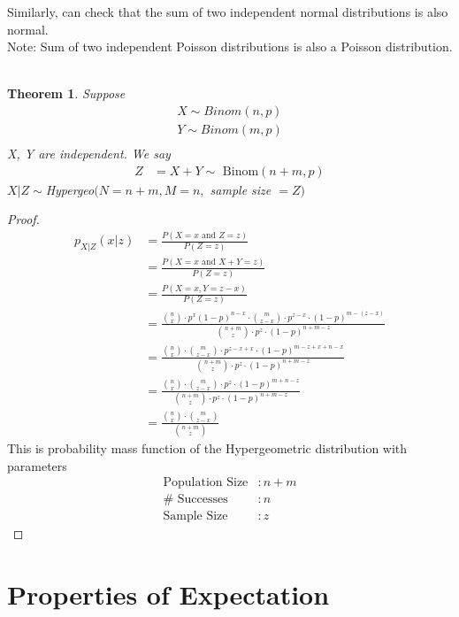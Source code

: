 \documentclass[11pt,oneside]{book}
\theoremstyle{break}
\theoremstyle{break}
\newtheorem{thm}{Theorem}[section]
\newcommand{\note}{\color{Purple}Note: \color{black}}
\begin{document}
Similarly, can check that the sum of two independent normal distributions is also normal. \\
\note Sum of two independent Poisson distributions is also a Poisson distribution.\\
\hfill\\
\begin{thm}
Suppose \begin{align*}
X\sim  Binom(n,p)\\
Y\sim  Binom(m,p)\\
\end{align*}
X, Y are independent. We say \begin{align*}
Z&=X+Y\sim \text{ Binom}(n+m,p)
\end{align*}
$X|Z\sim $Hypergeo$(N=n+m,M=n,$ sample size $=Z)$
\end{thm}
\begin{proof}
\begin{align*}
p_{X|Z}(x|z)&=\frac{P(X=x \text{ and }Z=z)}{P(Z=z)}\\
&=\frac{P(X=x \text{ and }X+Y=z)}{P(Z=z)}\\
&=\frac{P(X=x,Y=z-x)}{P(Z=z)}\\
&=\frac{\binom{n}{x}\cdot p^{x}(1-p)^{n-x}\cdot \binom{m}{z-x}\cdot p^{z-x}\cdot (1-p)^{m-(z-x)}}{\binom{n+m}{z}\cdot p^z \cdot (1-p)^{n+m-z}}\\
&=\frac{\binom{n}{x}\cdot \binom{m}{z-x}\cdot p^{z-x+x}\cdot (1-p)^{m-z+x+n-x}}{\binom{n+m}{z}\cdot p^z \cdot (1-p)^{n+m-z}}\\
&=\frac{\binom{n}{x}\cdot \binom{m}{z-x}\cdot p^{z}\cdot (1-p)^{m+n-z}}{\binom{n+m}{z}\cdot p^z \cdot (1-p)^{n+m-z}}\\
&=\frac{\binom{n}{x}\cdot \binom{m}{z-x}}{\binom{n+m}{z}}
\end{align*}
This is probability mass function of the Hypergeometric distribution with parameters \begin{align*}
\text{Population Size}&:n+m\\
\#\text{ Successes}&:n\\
\text{Sample Size}&:z 
\end{align*}
\end{proof}
\chapter[Properties of Expectation]{Properties of Expectation}
\end{document}
